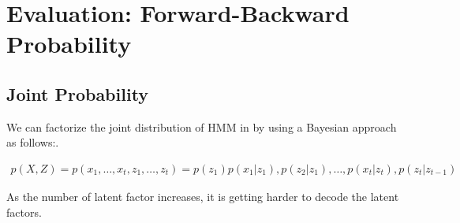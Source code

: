 \section{Evaluation: Forward-Backward Probability}




\subsection{Joint Probability}
We can factorize the joint distribution of HMM in  by using a Bayesian approach as follows:. 

\begin{align}
	p(X,Z) = p(x_1,\dots,x_t, z_1,\dots,z_t) = p(z_1)p(x_1|z_1),p(z_2|z_1),\dots,p(x_{t}|z_{t}),p(z_{t}|z_{t-1})
	\label{eq:hmm_joint}
\end{align}

As the number of latent factor increases, it is getting harder to decode the latent factors. 

